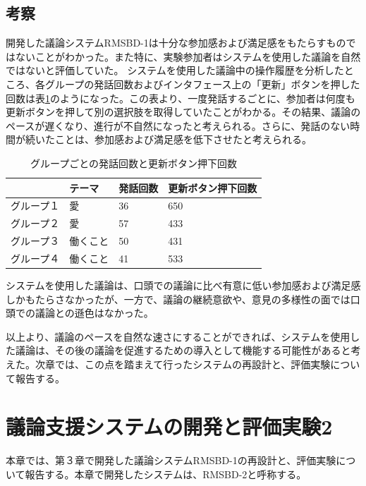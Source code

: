 \documentclass[11pt, a4paper]{jreport} %
\begin{document}
\section{考察}
開発した議論システムRMSBD-1は十分な参加感および満足感をもたらすものではないことがわかった。また特に、実験参加者はシステムを使用した議論を自然ではないと評価していた。
システムを使用した議論中の操作履歴を分析したところ、各グループの発話回数およびインタフェース上の「更新」ボタンを押した回数は表\ref{tab:jikken1_log}のようになった。この表より、一度発話するごとに、参加者は何度も更新ボタンを押して別の選択肢を取得していたことがわかる。その結果、議論のペースが遅くなり、進行が不自然になったと考えられる。さらに、発話のない時間が続いたことは、参加感および満足感を低下させたと考えられる。

\begin{table}[]
\centering
\caption{グループごとの発話回数と更新ボタン押下回数}
\label{tab:jikken1_log}
\begin{tabular}{@{}llll@{}}
\toprule
\multicolumn{1}{c}{} & テーマ  & 発話回数 & 更新ボタン押下回数 \\ \midrule
グループ１                & 愛    & 36   & 650       \\
グループ２                & 愛    & 57   & 433       \\
グループ３                & 働くこと & 50   & 431       \\
グループ４                & 働くこと & 41   & 533       \\ \bottomrule
\end{tabular}
\end{table}


システムを使用した議論は、口頭での議論に比べ有意に低い参加感および満足感しかもたらさなかったが、一方で、議論の継続意欲や、意見の多様性の面では口頭での議論との遜色はなかった。


以上より、議論のペースを自然な速さにすることができれば、システムを使用した議論は、その後の議論を促進するための導入として機能する可能性があると考えた。次章では、この点を踏まえて行ったシステムの再設計と、評価実験について報告する。





\chapter{議論支援システムの開発と評価実験2}
本章では、第３章で開発した議論システムRMSBD-1の再設計と、評価実験について報告する。本章で開発したシステムは、RMSBD-2と呼称する。
\end{document}
